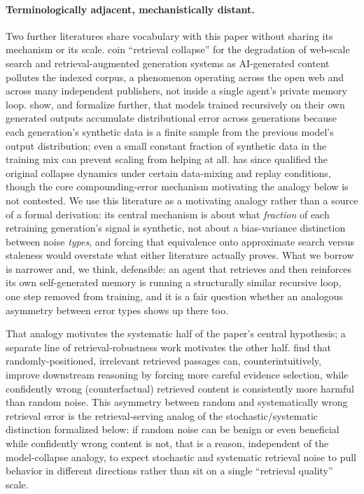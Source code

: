 \documentclass{article}
\begin{document}
\paragraph{Terminologically adjacent, mechanistically distant.} Two further literatures share vocabulary with this paper without sharing its mechanism or its scale. \citet{yu2026retrievalcollapse} coin ``retrieval collapse'' for the degradation of web-scale search and retrieval-augmented generation systems as AI-generated content pollutes the indexed corpus, a phenomenon operating across the open web and across many independent publishers, not inside a single agent's private memory loop. \citet{shumailov2024nature} show, and \citet{dohmatob2025strongcollapse} formalize further, that models trained recursively on their own generated outputs accumulate distributional error across generations because each generation's synthetic data is a finite sample from the previous model's output distribution; even a small constant fraction of synthetic data in the training mix can prevent scaling from helping at all. \citet{borji2024note} has since qualified the original collapse dynamics under certain data-mixing and replay conditions, though the core compounding-error mechanism motivating the analogy below is not contested. We use this literature as a motivating analogy rather than a source of a formal derivation: its central mechanism is about what \emph{fraction} of each retraining generation's signal is synthetic, not about a bias-variance distinction between noise \emph{types}, and forcing that equivalence onto approximate search versus staleness would overstate what either literature actually proves. What we borrow is narrower and, we think, defensible: an agent that retrieves and then reinforces its own self-generated memory is running a structurally similar recursive loop, one step removed from training, and it is a fair question whether an analogous asymmetry between error types shows up there too.

That analogy motivates the systematic half of the paper's central hypothesis; a separate line of retrieval-robustness work motivates the other half. \citet{cuconasu2024powerofnoise} find that randomly-positioned, irrelevant retrieved passages can, counterintuitively, improve downstream reasoning by forcing more careful evidence selection, while confidently wrong (counterfactual) retrieved content is consistently more harmful than random noise. This asymmetry between random and systematically wrong retrieval error is the retrieval-serving analog of the stochastic/systematic distinction formalized below: if random noise can be benign or even beneficial while confidently wrong content is not, that is a reason, independent of the model-collapse analogy, to expect stochastic and systematic retrieval noise to pull behavior in different directions rather than sit on a single ``retrieval quality'' scale.
\end{document}
